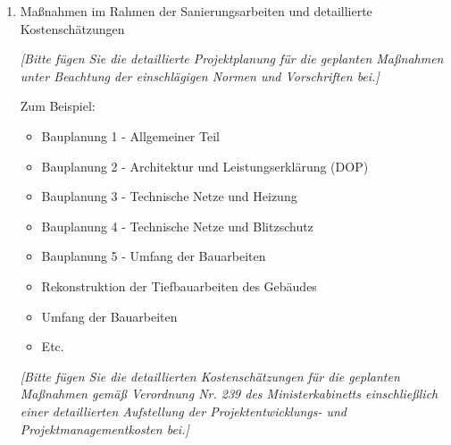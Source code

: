 \begin{enumerate}
\item{Maßnahmen im Rahmen der Sanierungsarbeiten und detaillierte Kostenschätzungen}

\textit{[Bitte fügen Sie die detaillierte Projektplanung für die geplanten Maßnahmen unter Beachtung der einschlägigen Normen und Vorschriften bei.]}
\vspace{5mm}

Zum Beispiel:

\begin{itemize}
	\item Bauplanung 1 - Allgemeiner Teil
	\item Bauplanung 2 - Architektur und Leistungserklärung (DOP)
	\item Bauplanung 3 - Technische Netze und Heizung
	\item Bauplanung 4 - Technische Netze und Blitzschutz
	\item Bauplanung 5 - Umfang der Bauarbeiten
	\item Rekonstruktion der Tiefbauarbeiten des Gebäudes
	\item Umfang der Bauarbeiten
	\item Etc.
\end{itemize}

\vspace{5mm}
\textit{[Bitte fügen Sie die detaillierten Kostenschätzungen für die geplanten Maßnahmen gemäß Verordnung Nr. 239 des Ministerkabinetts einschließlich einer detaillierten Aufstellung der Projektentwicklungs- und Projektmanagementkosten bei.]}

\end{enumerate}
